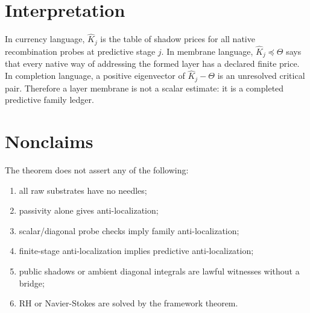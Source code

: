 \documentclass[11pt]{article}
\begin{document}
\section{Interpretation}
In currency language, $\widehat K_j$ is the table of shadow prices for all native recombination probes at predictive stage $j$.  In membrane language, $\widehat K_j\preceq\Theta$ says that every native way of addressing the formed layer has a declared finite price.  In completion language, a positive eigenvector of $\widehat K_j-\Theta$ is an unresolved critical pair.  Therefore a layer membrane is not a scalar estimate: it is a completed predictive family ledger.

\section{Nonclaims}
The theorem does not assert any of the following:
\begin{enumerate}[label=(N\arabic*)]
\item all raw substrates have no needles;
\item passivity alone gives anti-localization;
\item scalar/diagonal probe checks imply family anti-localization;
\item finite-stage anti-localization implies predictive anti-localization;
\item public shadows or ambient diagonal integrals are lawful witnesses without a bridge;
\item RH or Navier-Stokes are solved by the framework theorem.
\end{enumerate}
\end{document}
